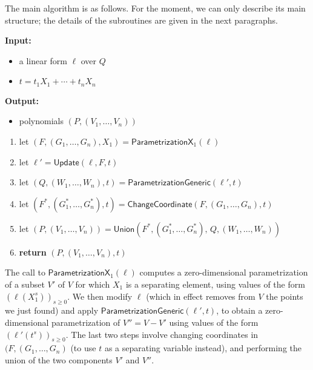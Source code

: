 \documentclass[12pt]{article}
\begin{document}
The main algorithm is as follows. For the moment, we can only describe
its main structure; the details of the subroutines are given in the
next paragraphs.

\begin{algorithm}[H]
	\caption{$\mathsf{Parametrization}(\ell,t)$} {\bf
		Input:} \vspace{-0.5em}
	\begin{itemize}\setlength\itemsep{0em}
		\item a linear form $\ell$ over $Q$
		\item $t=t_1 X_1 + \cdots + t_n X_n$
	\end{itemize}
	{\bf Output:} \vspace{-0.5em}
	\begin{itemize}\setlength\itemsep{0em}
		\item polynomials $(P,(V_1,\dots,V_n))$
	\end{itemize}
	\begin{enumerate}
		\item let $(F,(G_1,\dots,G_n),X_1)=\mathsf{ParametrizationX}_1(\ell)$
		\item let $\ell'=\mathsf{Update}(\ell,F,t)$
		\item let $(Q,(W_1,\dots,W_n),t)=\mathsf{ParametrizationGeneric}(\ell',t)$
		\item let $(F^*,(G^*_1,\dots,G^*_n),t)=\mathsf{ChangeCoordinate}(F,(G_1,\dots,G_n),t)$
		\item let  $(P,(V_1,\dots,V_n))=\mathsf{Union}(F^*,(G^*_1,\dots,G^*_n),\, Q,(W_1,\dots,W_n))$
		\item \textbf{return} $(P,(V_1,\dots,V_n),t)$
	\end{enumerate}
\end{algorithm}

The call to $\mathsf{ParametrizationX}_1(\ell)$ computes a
zero-dimensional parametrization of a subset $V'$ of $V$ for which
$X_1$ is a separating element, using values of the form
$(\ell(X_1^s))_{s \ge 0}$. We then modify $\ell$ (which in effect
removes from $V$ the points we just found) and apply
$\mathsf{ParametrizationGeneric}(\ell',t)$, to obtain a
zero-dimensional parametrization of $V''=V-V'$ using values of the form
$(\ell'(t^s))_{s \ge 0}$. The last two steps involve changing
coordinates in $(F,(G_1,\dots,G_n)$ (to use $t$ as a separating
variable instead), and performing the union of the two components $V'$
and $V''$.

\end{document}
